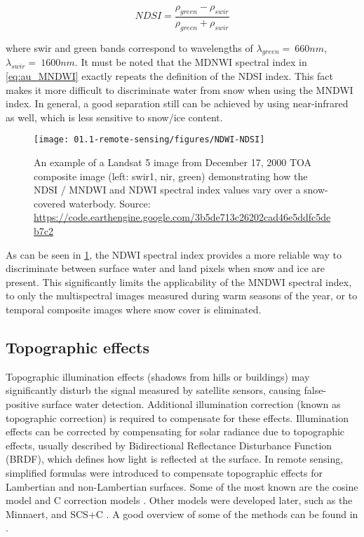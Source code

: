 \begin{equation}
NDSI=\frac{\rho_{green}-\rho_{swir}}{\rho_{green}+\rho_{swir}}
\end{equation}

where swir and green bands correspond to wavelengths of $\lambda_{green}=~660nm$, $\lambda_{swir}=~1600nm$. It must be noted that the MDNWI spectral index in \ref{eq:au_MNDWI} exactly repeats the definition of the NDSI index. This fact makes it more difficult to discriminate water from snow when using the MNDWI index. In general, a good separation still can be achieved by using near-infrared as well, which is less sensitive to snow/ice content.

\begin{figure}[H]
	\texttt{[image: 01.1-remote-sensing/figures/NDWI-NDSI]}
	\caption{An example of a Landsat 5 image from December 17, 2000 TOA composite image (left: swir1, nir, green) demonstrating how the NDSI / MNDWI and NDWI spectral index values vary over a snow-covered waterbody. Source: \url{https://code.earthengine.google.com/3b5de713c26202cad46e5ddfc5deb7c2}}
	\label{fig:snow}
\end{figure}

As can be seen in \ref{fig:snow}, the NDWI spectral index provides a more reliable way to discriminate between surface water and land pixels when snow and ice are present. This significantly limits the applicability of the MNDWI spectral index, to only the multispectral images measured during warm seasons of the year, or to temporal composite images where snow cover is eliminated.

\subsection{Topographic effects}

Topographic illumination effects (shadows from hills or buildings) may significantly disturb the signal measured by satellite sensors, causing false-positive surface water detection. Additional illumination correction (known as topographic correction) is required to compensate for these effects. Illumination effects can be corrected by compensating for solar radiance due to topographic effects, usually described by Bidirectional Reflectance Disturbance Function (BRDF), which defines how light is reflected at the surface. In remote sensing, simplified formulas were introduced to compensate topographic effects for Lambertian and non-Lambertian surfaces. Some of the most known are the cosine model and C correction models \citep{teillet1982slope}. Other models were developed later, such as the Minnaert, and SCS+C \citep{smith1980lambertian, teillet1982slope}. A good overview of some of the methods can be found in \citep{gao2009simple, soenen2005scs+}. 

